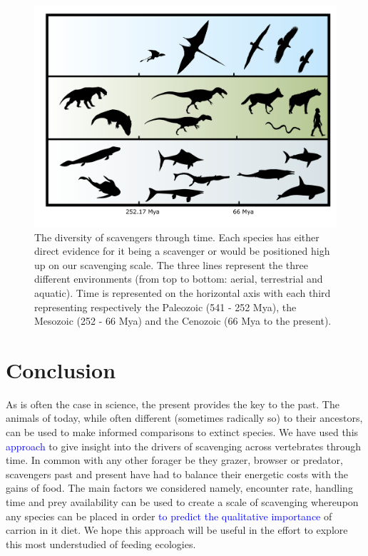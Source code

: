 \documentclass[a4paper,12pt]{article}
\begin{document}
\begin{figure}[!htbp]
\centering
   \includegraphics[width=1\textwidth]{timeline_figure/timeLine.pdf}
\caption{The diversity of scavengers through time. Each species has either direct evidence for it being a scavenger or would be positioned high up on our scavenging scale. The three lines represent the three different environments (from top to bottom: aerial, terrestrial and aquatic). Time is represented on the horizontal axis with each third representing respectively the Paleozoic (541 - 252 Mya), the Mesozoic (252 - 66 Mya) and the Cenozoic (66 Mya to the present).}
\label{Timeline}
\end{figure}

\section*{Conclusion}
As is often the case in science, the present provides the key to the past.
The animals of today, while often different (sometimes radically so) to their ancestors, can be used to make informed comparisons to extinct species. 
We have used this \textcolor{blue}{approach} to give insight into the drivers of scavenging across vertebrates through time.
In common with any other forager be they grazer, browser or predator, scavengers past and present have had to balance their energetic costs with the gains of food. 
The main factors we considered namely, encounter rate, handling time and prey availability can be used to create a scale of scavenging whereupon any species can be placed in order \textcolor{blue}{to predict the qualitative importance} of carrion in it diet.
We hope this approach will be useful in the effort to explore this most understudied of feeding ecologies. 
\end{document}
